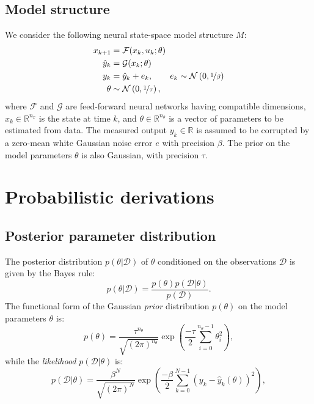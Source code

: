 \documentclass{article}
\newcommand{\R}{\mathbb{R}}
\newcommand{\nx}{{n_x}}
\newcommand{\nsamp}{N}
\newcommand{\npar}{{n_\theta}}
\newcommand{\F}{\mathcal{F}} %
\newcommand{\G}{\mathcal{G}} %
\newcommand{\N}{\mathcal{N}} %
\newcommand{\mean}[1]{\hat{#1}}
\newcommand{\D}{\mathcal{D}} %
\begin{document}
\subsection{Model structure}
We consider the following neural state-space model structure $M$: 
 \begin{subequations}
  \label{eq:ss_model}
 \begin{align}
  x_{k+1} &= \F(x_k, u_k; \theta) \label{eq:ss_model_a} \\
  \mean{y}_{k} &= \G(x_k; \theta) \label{eq:ss_model_b}\\
  y_{k} &=  \mean{y}_{k} + e_k, \qquad e_k \sim \N\left(0, \nicefrac{1}{\beta}\right)  \\
  \theta &\sim \N\left(0, \nicefrac{1}{\tau}\right),
  \end{align}
\end{subequations}
where $\F$ and $\G$ are feed-forward neural networks having compatible dimensions, $x_k \in \mathbb{R}^{\nx}$ is the state at time $k$, and $\theta \in \mathbb{R}^{n_\theta}$ is a vector of parameters to be estimated from data. The measured output $y_{k} \in \R$ is assumed to be corrupted by a zero-mean white Gaussian noise error $e$ with {precision} $\beta$. The prior on the model parameters $\theta$ is also Gaussian, with precision $\tau$.


\section{Probabilistic derivations}
\subsection{Posterior parameter distribution}
The  posterior distribution $p(\theta |  \D)$ of $\theta$ conditioned on the observations $\D$ is given by the Bayes rule:
\begin{equation}
\label{eq:bayes_rule}
p(\theta |  \D) = \frac{p(\theta) p(\D|\theta)}{p(\D)}.
\end{equation}
The functional form of the Gaussian \emph{prior} distribution $p(\theta)$ on the model parameters $\theta$ is:
\begin{equation}
\label{eq:theta_prior}
p(\theta) = \frac{\tau^\npar}{\sqrt{(2\pi)^{\npar} }} \exp\left(\frac{-\tau}{2} \sum_{i=0}^{\npar-1} \theta_i^2\right),
\end{equation}
while the \emph{likelihood} $p(\mathcal{D}|\theta)$ is:
\begin{equation}
\label{eq:likelihood}
p(\mathcal{D}|\theta) = \frac{\beta^\nsamp}{\sqrt{(2\pi)^{\nsamp} }} \exp\left(\frac{-\beta}{2}\sum_{k=0}^{\nsamp-1}{(y_k - \mean{y}_k(\theta))^2}\right),
\end{equation}
\end{document}
